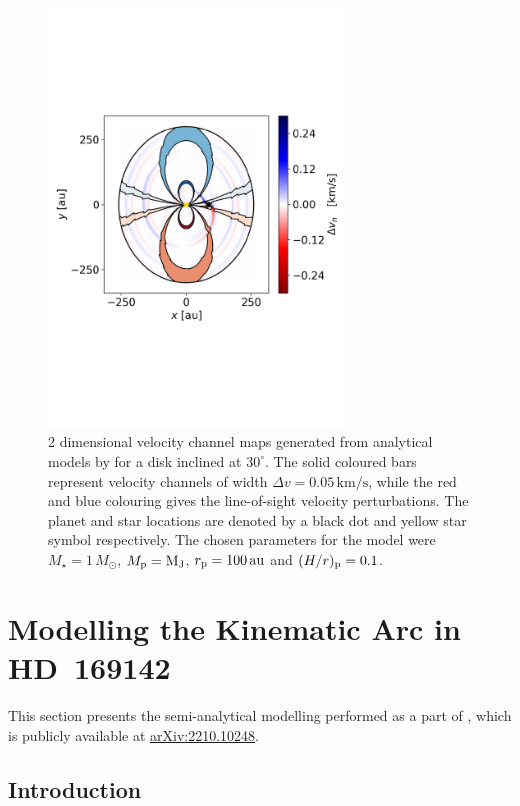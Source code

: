 \begin{figure}%
    \centering
    \includegraphics[width = 0.7\textwidth]{figures/bollati_2d_kinks.pdf}
    \caption{2 dimensional velocity channel maps generated from analytical models by \citet{bollati2021} for a disk inclined at $30^\circ$. The solid coloured bars represent velocity channels of width $\Delta v = 0.05 \, \mathrm{km/s}$, while the red and blue colouring gives the line-of-sight velocity perturbations. The planet and star locations are denoted by a black dot and yellow star symbol respectively. The chosen parameters for the model were $M_\star = 1\, M_\odot$, $M_{\rm p}=\mathrm{M_J}$, $r_{\rm p} = 100\, \mathrm{au}$ and $(H/r)_{\rm p}=0.1$.}
    \label{fig:2D_kinks}
\end{figure}

\section{Modelling the Kinematic Arc in HD~169142} \label{sec:hd169}

This section presents the semi-analytical modelling performed as a part of \citet{garg2022}, which is publicly available at \href{https://arxiv.org/abs/2207.02869}{\url{arXiv:2210.10248}}.

\subsection{Introduction}

